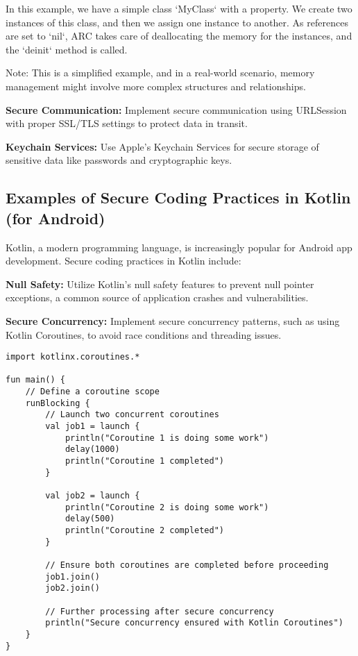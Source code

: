 \documentclass[conference]{IEEEtran}
\begin{document}
In this example, we have a simple class `MyClass` with a property. We create two instances of this class, and then we assign one instance to another. As references are set to `nil`, ARC takes care of deallocating the memory for the instances, and the `deinit` method is called.

Note: This is a simplified example, and in a real-world scenario, memory management might involve more complex structures and relationships.


\textbf{Secure Communication:} Implement secure communication using URLSession with proper SSL/TLS settings to protect data in transit.

\textbf{Keychain Services:} Use Apple's Keychain Services for secure storage of sensitive data like passwords and cryptographic keys.

\subsection{Examples of Secure Coding Practices in Kotlin (for Android)}

Kotlin, a modern programming language, is increasingly popular for Android app development. Secure coding practices in Kotlin include:

\textbf{Null Safety:} Utilize Kotlin's null safety features to prevent null pointer exceptions, a common source of application crashes and vulnerabilities.

\textbf{Secure Concurrency:} Implement secure concurrency patterns, such as using Kotlin Coroutines, to avoid race conditions and threading issues.

\begin{lstlisting}[style=kotlinStyle, caption={Secure Concurrency using Kotlin Coroutines}]
import kotlinx.coroutines.*

fun main() {
    // Define a coroutine scope
    runBlocking {
        // Launch two concurrent coroutines
        val job1 = launch {
            println("Coroutine 1 is doing some work")
            delay(1000)
            println("Coroutine 1 completed")
        }

        val job2 = launch {
            println("Coroutine 2 is doing some work")
            delay(500)
            println("Coroutine 2 completed")
        }

        // Ensure both coroutines are completed before proceeding
        job1.join()
        job2.join()

        // Further processing after secure concurrency
        println("Secure concurrency ensured with Kotlin Coroutines")
    }
}
\end{lstlisting}
\end{document}
